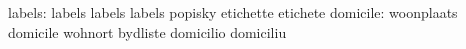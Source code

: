 %
                          labels: labels                           labels
                                  labels                           popisky
                                  etichette                        etichete
                        domicile: woonplaats                       domicile
                                  wohnort                          bydliste
                                  domicilio                        domiciliu

\stopcommands


\stoplogginginterface

\endinput
